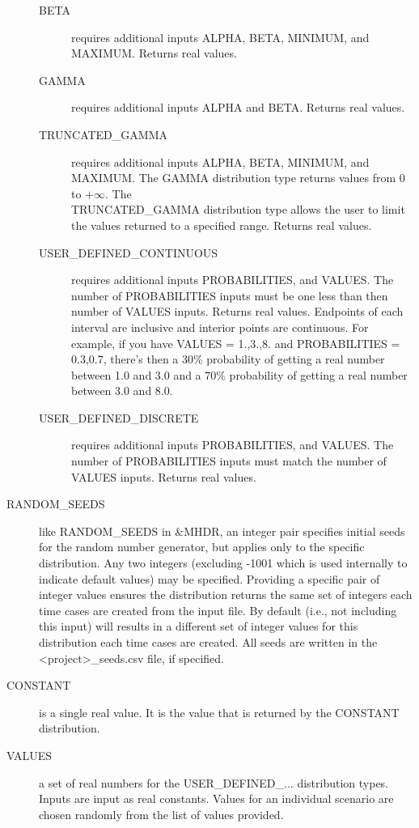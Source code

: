 \documentclass[12pt,twoside]{book}
\begin{document}
\begin{description}
\begin{description}
        \item[BETA] requires additional inputs {\ct ALPHA}, {\ct BETA}, {\ct MINIMUM}, and {\ct MAXIMUM}. Returns real values.
        \item[GAMMA] requires additional inputs {\ct ALPHA} and {\ct BETA}. Returns real values.
        \item[TRUNCATED\_GAMMA] requires additional inputs {\ct ALPHA}, {\ct BETA}, {\ct MINIMUM}, and {\ct MAXIMUM}. The {\ct GAMMA} distribution type returns values from $0$ to $+\infty$. The \\
            {\ct TRUNCATED\_GAMMA} distribution type allows the user to limit the values returned to a specified range. Returns real values.
        \item[USER\_DEFINED\_CONTINUOUS] requires additional inputs {\ct PROBABILITIES}, and
{\ct VALUES}. The number of {\ct PROBABILITIES} inputs must be one less than then number of {\ct VALUES} inputs. Returns real values. Endpoints of each interval are inclusive and interior points are continuous. For example, if you have {\ct VALUES} = 1.,3.,8. and {\ct PROBABILITIES} = 0.3,0.7, there’s then a 30\% probability of getting a real number between 1.0 and 3.0 and a 70\% probability of getting a real number between 3.0 and 8.0.
        \item[USER\_DEFINED\_DISCRETE] requires additional inputs {\ct PROBABILITIES}, and
{\ct VALUES}. The number of {\ct PROBABILITIES} inputs must match the number of \\
{\ct VALUES} inputs. Returns real values.
      \end{description}
  \item[RANDOM\_SEEDS] like {\ct RANDOM\_SEEDS} in {\ct \&MHDR}, an integer pair specifies initial seeds for the random number generator, but applies only to the specific distribution. Any two integers (excluding -1001 which is used internally to indicate default values) may be specified. Providing a specific pair of integer values ensures the distribution returns the same set of integers each time cases are created from the input file. By default (i.e., not including this input) will results in a different set of integer values for this distribution each time cases are created.  All seeds are written in the {\ct <project>\_seeds.csv} file, if specified.
  \item[CONSTANT] is a single real value. It is the value that is returned by the {\ct CONSTANT} distribution.
  \item[VALUES] a set of real numbers for the {\ct USER\_DEFINED\_...} distribution types. Inputs are input as real constants. Values for an individual scenario are chosen randomly from the list of values provided.

\end{description}
\end{document}
